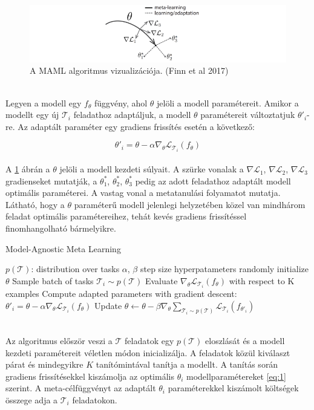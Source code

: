 \begin{figure}[!ht]
	\centering
	\includegraphics[width=200mm, keepaspectratio]{figures/maml.png}
	\caption{A MAML algoritmus vizualizációja. (Finn et al 2017)}
	\label{fig:maml}
\end{figure}
\ \\
Legyen a modell egy $f_\theta$ függvény, ahol $\theta$ jelöli a modell paramétereit. Amikor a modellt egy új $\mathcal{T}_i$ feladathoz adaptáljuk, a modell $\theta$ paramétereit változtatjuk $\theta'_i$-re. Az adaptált paraméter egy gradiens frissítés esetén a következő:

\begin{equation} \label{eq:1}
\theta'_i = \theta - \alpha\nabla_{\theta}\mathcal{L}_{\mathcal{T}_i}(f_{\theta})
\end{equation}
\ \\
A \ref{fig:maml} ábrán a $\theta$ jelöli a modell kezdeti súlyait. A szürke vonalak a $\nabla\mathcal{L}_1$, $\nabla\mathcal{L}_2$, $\nabla\mathcal{L}_3$ gradienseket
mutatják, a $\theta^*_1$, $\theta^*_2$, $\theta^*_3$ pedig az adott feladathoz adaptált modell optimális paraméterei. A vastag vonal a metatanulási folyamatot mutatja. Látható, hogy a $\theta$ paraméterű modell jelenlegi helyzetében közel van mindhárom feladat optimális paramétereihez, tehát kevés gradiens frissítéssel finomhangolható bármelyikre.

\begin{algorithm}
	\caption{Model-Agnostic Meta Learning}
	\label{fig:maml-pseudo}
	\begin{algorithmic}[1]
		\Require $p(\mathcal{T})$: distribution over tasks
		\Require $\alpha$, $\beta$ step size hyperpatameters
		\State randomly initialize $\theta$
		\State Sample batch of tasks $\mathcal{T}_i \sim p(\mathcal{T})$
		\State Evaluate $\nabla_{\theta}\mathcal{L}_{\mathcal{T}_i}(f_{\theta})$ with respect to K examples
		\State Compute adapted parameters with gradient descent: $\theta'_i = \theta - \alpha\nabla_{\theta}\mathcal{L}_{\mathcal{T}_i}(f_{\theta})$
		\EndFor
		\State Update $\theta \gets \theta - \beta\nabla_{\theta}\sum_{\mathcal{T}_i\sim p(\mathcal{T})}\mathcal{L}_{\mathcal{T}_i} (f_{\theta'_i})$
		\EndWhile
	\end{algorithmic}
\end{algorithm}
\ \\
Az algoritmus először veszi a $\mathcal{T}$ feladatok egy $p(\mathcal{T})$ eloszlását és a modell kezdeti paramétereit véletlen módon inicializálja. A feladatok közül kiválaszt párat és mindegyikre $K$ tanítómintával tanítja a modellt. A tanítás során gradiens frissítésekkel kiszámolja az optimális $\theta_i$ modellparamétereket \ref{eq:1} szerint. 
A meta-célfüggvényt az adaptált $\theta_i$ paraméterekkel kiszámolt költségek összege adja a $\mathcal{T}_i$ feladatokon.

